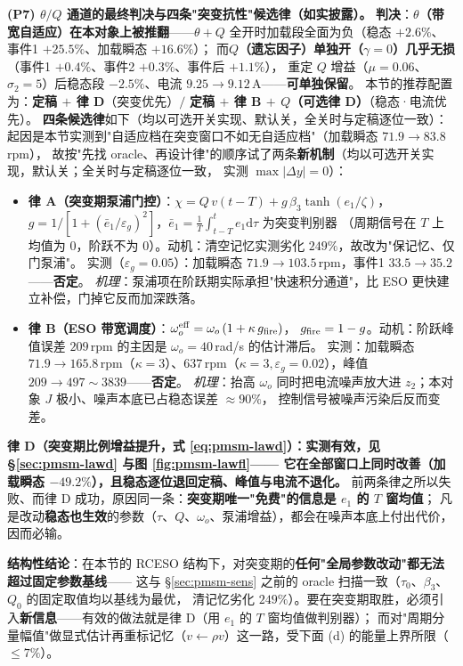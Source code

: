 \documentclass[11pt]{article}
\theoremstyle{remark}\newtheorem{remark}{注}
\begin{document}
\noindent\textbf{(P7) $\theta/Q$ 通道的最终判决与四条"突变抗性"候选律（如实披露）。}
\textbf{判决}：\textbf{$\theta$（带宽自适应）在本对象上被推翻}——$\theta+Q$ 全开时加载段全面为负（稳态 $+2.6\%$、事件1 $+25.5\%$、加载瞬态 $+16.6\%$）；
而\textbf{$Q$（遗忘因子）单独开（$\gamma=0$）几乎无损}（事件1 $+0.4\%$、事件2 $+0.3\%$、事件后 $+1.1\%$），
重定 $Q$ 增益（$\mu=0.06$、$\sigma_2=5$）后稳态段 $-2.5\%$、电流 $9.25\to9.12$\,A——\textbf{可单独保留}。
本节的推荐配置为：\textbf{定稿 $+$ 律 D}（突变优先）$/$ \textbf{定稿 $+$ 律 B $+$ $Q$（可选律 D）}（稳态·电流优先）。
\textbf{四条候选律}如下（均以可选开关实现、默认关，全关时与定稿逐位一致）：
起因是本节实测到"自适应档在突变窗口不如无自适应档"（加载瞬态 $71.9\to83.8$\,rpm），
故按"先找 oracle、再设计律"的顺序试了两条\textbf{新机制}（均以可选开关实现，默认关；全关时与定稿逐位一致，
实测 $\max|\Delta y|=0$）：
\begin{itemize}
  \item \textbf{律 A（突变期泵浦门控）}：$\chi=Q\,v(t-T)+g\,\beta_3\tanh(e_1/\zeta)$，
        $g=1/[1+(\bar e_1/\varepsilon_g)^2]$，$\bar e_1=\frac1T\int_{t-T}^{t}e_1\mathrm d\tau$ 为突变判别器
        （周期信号在 $T$ 上均值为 $0$，阶跃不为 $0$）。动机：清空记忆实测劣化 $249\%$，故改为"保记忆、仅门泵浦"。
        实测（$\varepsilon_g=0.05$）：加载瞬态 $71.9\to103.5$\,rpm，事件1 $33.5\to35.2$——\textbf{否定}。
        \emph{机理}：泵浦项在阶跃期实际承担"快速积分通道"，比 ESO 更快建立补偿，门掉它反而加深跌落。
  \item \textbf{律 B（ESO 带宽调度）}：$\omega_o^{\rm eff}=\omega_o\,(1+\kappa\,g_{\rm fire})$，
        $g_{\rm fire}=1-g$。动机：阶跃峰值误差 $209$\,rpm 的主因是 $\omega_o=40$\,rad/s 的估计滞后。
        实测：加载瞬态 $71.9\to165.8$\,rpm（$\kappa=3$）、$637$\,rpm（$\kappa=3,\varepsilon_g=0.02$），峰值 $209\to497\sim3839$——\textbf{否定}。
        \emph{机理}：抬高 $\omega_o$ 同时把电流噪声放大进 $z_2$；本对象 $J$ 极小、噪声本底已占稳态误差 $\approx90\%$，
        控制信号被噪声污染后反而变差。
\end{itemize}
\noindent\textbf{律 D（突变期比例增益提升，式 \eqref{eq:pmsm-lawd}）：\textbf{实测有效}，见 §\ref{sec:pmsm-lawd} 与图 \ref{fig:pmsm-lawfl}——
它在\textbf{全部}窗口上同时改善（加载瞬态 $-49.2\%$），且稳态逐位退回定稿、峰值与电流不退化。}
前两条律之所以失败、而律 D 成功，原因同一条：\textbf{突变期唯一"免费"的信息是 $e_1$ 的 $T$ 窗均值}；
凡是改动\textbf{稳态也生效}的参数（$\tau$、$Q$、$\omega_o$、泵浦增益），都会在噪声本底上付出代价，因而必输。

\noindent\textbf{结构性结论}：在本节的 RCESO 结构下，对突变期的\textbf{任何"全局参数改动"都无法超过固定参数基线}——
这与 §\ref{sec:pmsm-sens} 之前的 oracle 扫描一致（$\tau_0$、$\beta_3$、$Q_0$ 的固定取值均以基线为最优，
清记忆劣化 $249\%$）。要在突变期取胜，必须引入\textbf{新信息}——有效的做法就是律 D（用 $e_1$ 的 $T$ 窗均值做判别器）；
而对"周期分量幅值"做显式估计再重标记忆（$v\leftarrow\rho v$）这一路，受下面 (d) 的能量上界所限（$\le7\%$）。
\end{document}
